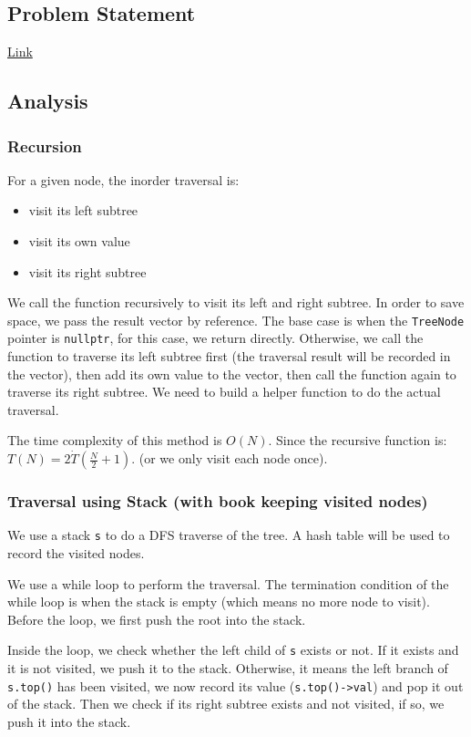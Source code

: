 \documentclass[12pt]{article}
\begin{document}
\subsection{Problem Statement}
\label{sec:org8ec55d1}
\href{https://leetcode.com/problems/binary-tree-inorder-traversal/}{Link}
\subsection{Analysis}
\label{sec:org7d5b1c7}
\subsubsection{Recursion}
\label{sec:org0d6acfb}
For a given node, the inorder traversal is:
\begin{itemize}
\item visit its left subtree
\item visit its own value
\item visit its right subtree
\end{itemize}

We call the function recursively to visit its left and right subtree. In order to save space, we pass the result vector by reference. The base case is when the \texttt{TreeNode} pointer is \texttt{nullptr}, for this case, we return directly. Otherwise, we call the function to traverse its left subtree first (the traversal result will be recorded in the vector), then add its own value to the vector, then call the function again to traverse its right subtree. We need to build a helper function to do the actual traversal.

The time complexity of this method is \(O(N)\). Since the recursive function is: \(T(N) = 2\dot T(\frac{N}{2} + 1)\). (or we only visit each node once).
\subsubsection{Traversal using Stack (with book keeping visited nodes)}
\label{sec:org7bc34d0}
We use a stack \texttt{s} to do a DFS traverse of the tree. A hash table will be used to record the visited nodes.

We use a while loop to perform the traversal. The termination condition of the while loop is when the stack is empty (which means no more node to visit). Before the loop, we first push the root into the stack.

Inside the loop, we check whether the left child of \texttt{s} exists or not. If it exists and it is not visited, we push it to the stack. Otherwise, it means the left branch of \texttt{s.top()} has been visited, we now record its value (\texttt{s.top()->val}) and pop it out of the stack. Then we check if its right subtree exists and not visited, if so, we push it into the stack.
\end{document}
